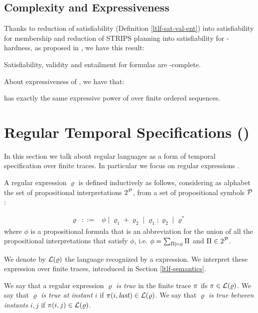 \subsection{Complexity and Expressiveness}
Thanks to reduction of \LTLf satisfiability (Definition \ref{ltlf-sat-val-ent}) into \LTL satisfiability for \PSPACE membership and reduction of STRIPS planning into \LTLf satisfiability for \PSPACE-hardness, as proposed in \citep{de2013linear}, we have this result:
\begin{theorem}
	Satisfiability, validity and entailment for \LTLf formulas are \PSPACE-complete.
\end{theorem}

About expressiveness of \LTLf, we have that:
\begin{theorem}
	\LTLf has exactly the same expressive power of \FOL over finite ordered sequences.
\end{theorem}

\section{Regular Temporal Specifications (\RE)}
In this section we talk about regular languages as a form of temporal specification over finite traces. In particular we focus on regular expressions \citep{Hopcroft:2000:IAT:557657}.

A regular expression $\varrho$ is defined inductively as follows, considering as alphabet the set of propositional interpretations $2^{\mathcal{P}}$, from a set of propositional symbols $\mathcal{P}$:

\[\begin{array}{rcl}
\varrho &::=& \phi \mid \varrho_1 + \varrho_2 \mid \varrho_1 ; \varrho_2 \mid \varrho^*
\end{array}
\]
where $\phi$ is a propositional formula that is an abbreviation for the union of all the propositional interpretations that satisfy $\phi$, i.e. $\phi = \sum_{\Pi\models \phi} \Pi$ and $\Pi\in 2^{\mathcal{P}}$.

We denote by $\mathcal{L}(\varrho)$ the language recognized by a \RE expression. We interpret these expression over finite traces, introduced in Section \ref{ltlf-semantics}.
\begin{definition}
	We say that a regular expression $\varrho$ \emph{is true} in the finite trace $\pi$ ifs $\pi \in \mathcal{L}(\varrho)$. We say that $\varrho$ \emph{is true at instant $i$} if $\pi(i, \mathit{last})\in \mathcal{L}(\varrho)$. We say that $\varrho$ \emph{is true between instants $i, j$} if $\pi(i, j) \in \mathcal{L}(\varrho)$.
\end{definition}

